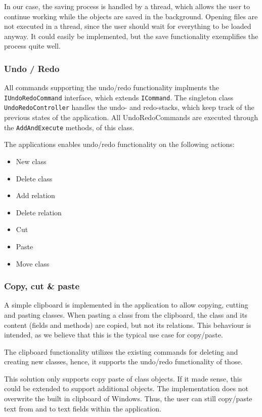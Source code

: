 In our case, the saving process is handled by a thread, which allows the user to
continue working while the objects are saved in the background. Opening files
are not executed in a thread, since the user should wait for everything to be
loaded anyway. It could easily be implemented, but the save functionality
exemplifies the process quite well.


\subsubsection{Undo / Redo}
All commands supporting the undo/redo functionality implments the
\texttt{IUndoRedoCommand} interface, which extends \texttt{ICommand}. The singleton class
\texttt{UndoRedoController} handles the undo- and redo-stacks, which keep track of the
previous states of the application. All UndoRedoCommands are executed through
the \texttt{AddAndExecute} methods, of this class.

The applications enables undo/redo functionality on the following actions:


\begin{itemize}
	\item New class
	\item Delete class
	\item Add relation
	\item Delete relation
	\item Cut
	\item Paste
	\item Move class
\end{itemize}


\subsubsection{Copy, cut \& paste}

A simple clipboard is implemented in the
application to allow copying, cutting and pasting classes. When pasting a class
from the clipboard, the class and its content (fields and methods) are copied,
but not its relations. This behaviour is intended, as we believe that this is
the typical use case for copy/paste.

The clipboard functionality utilizes the existing commands for deleting and
creating new classes, hence, it supports the undo/redo functionality of
those.

This solution only supports copy paste of class objects. If it made sense, this 
could be extended to support additional objects. The implementation does not 
overwrite the built in clipboard of Windows. Thus, the user can still 
copy/paste text from and to text fields within the application.

